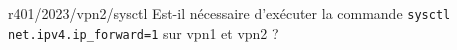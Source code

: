 \begin{question}{r401/2023/vpn2/sysctl}
  Est-il nécessaire d'exécuter la commande \texttt{sysctl
    net.ipv4.ip\_forward=1} sur vpn1 et vpn2 ?
  \begin{reponseshoriz}
  \end{reponseshoriz}
\end{question}
